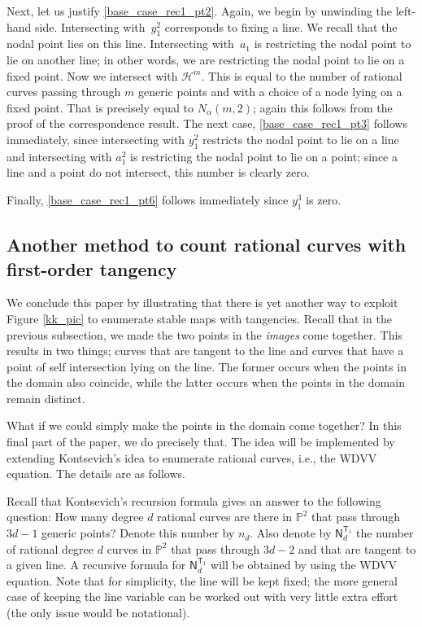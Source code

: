 \documentclass[pdftex]{sigma}
\numberwithin{equation}{section}
\begin{document}
Next, let us justify \eqref{base_case_rec1_pt2}. Again, we begin by unwinding the left-hand side.
Intersecting with~$y_1^2$ corresponds to fixing a line. We recall that the nodal point lies on this line.
Intersecting with~$a_1$ is restricting the nodal point to lie on another line; in other words, we are restricting the
nodal point to lie on a fixed point. Now we intersect with $\mathcal{H}^m$.
This is equal to the number of rational curves passing through $m$ generic points and
with a choice of a node lying on a fixed point.
That is precisely equal to $N_{\alpha}(m, 2)$; again this follows from the
proof of the correspondence result. The next case, \eqref{base_case_rec1_pt3} follows immediately,
since intersecting with $y_1^2$ restricts the nodal point to lie on a line and intersecting with
$a_1^2$ is restricting the nodal point to lie on a point; since a line and a point do not intersect, this number is clearly zero.

Finally, \eqref{base_case_rec1_pt6} follows immediately since $y_1^3$ is zero.

\subsection{Another method to count rational curves with first-order tangency}\label{Rel_GW_WDVV}

We conclude this paper by illustrating that there is yet another way to exploit Figure \ref{kk_pic} to
enumerate stable maps with tangencies. Recall that in the previous subsection, we made the two points
in the \textit{images} come together. This results in two things; curves that are tangent to the line and
curves that have a point of self intersection lying on the line. The former occurs when the points in the
domain also coincide, while the latter occurs when the points in the domain remain distinct.

What if we could simply make the points in the domain come together? In this final part of the paper, we
do precisely that. The idea will be implemented by extending Kontsevich's idea to enumerate rational curves, i.e.,
the WDVV equation. The details are as follows.

Recall that Kontsevich's recursion formula gives an answer to the following question:
How many degree $d$ rational curves are there in $\mathbb{P}^2$ that pass through $3d-1$ generic points?
Denote this number by $n_d$. Also denote by $\mathsf{N}_d^{\mathsf{T}_1}$ the
number of rational degree $d$ curves in $\mathbb{P}^2$ that pass through $3d-2$ and that are tangent to a given line.
A recursive formula for $\mathsf{N}_d^{\mathsf{T}_1}$ will be obtained by using the WDVV equation.
Note that for simplicity, the line will be kept fixed; the more general case of keeping the line variable
can be worked out with very little extra effort (the only issue would be notational).
\end{document}
